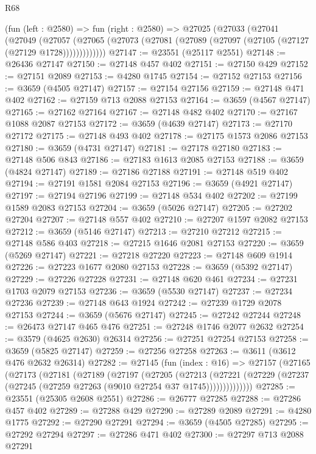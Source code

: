 \begin{lexlean}{R68}
\begin{coremodule}
    (fun (left : @2580) =>
    fun (right : @2580) =>
    @27025
      (@27033
        (@27041
          (@27049
            (@27057
              (@27065 (@27073 (@27081 (@27089 (@27097 (@27105 (@27127 (@27129 @1728)))))))))))))
@27147 := @23551 (@25117 @2551)
@27148 := @26436 @27147
@27150 := @27148 @457 @402
@27151 := @27150 @429
@27152 := @27151 @2089
@27153 := @4280 @1745
@27154 := @27152 @27153
@27156 := @3659 (@4505 @27147)
@27157 := @27154 @27156
@27159 := @27148 @471 @402
@27162 := @27159 @713 @2088 @27153
@27164 := @3659 (@4567 @27147)
@27165 := @27162 @27164
@27167 := @27148 @482 @402
@27170 := @27167 @1088 @2087 @27153
@27172 := @3659 (@4639 @27147)
@27173 := @27170 @27172
@27175 := @27148 @493 @402
@27178 := @27175 @1573 @2086 @27153
@27180 := @3659 (@4731 @27147)
@27181 := @27178 @27180
@27183 := @27148 @506 @843
@27186 := @27183 @1613 @2085 @27153
@27188 := @3659 (@4824 @27147)
@27189 := @27186 @27188
@27191 := @27148 @519 @402
@27194 := @27191 @1581 @2084 @27153
@27196 := @3659 (@4921 @27147)
@27197 := @27194 @27196
@27199 := @27148 @534 @402
@27202 := @27199 @1589 @2083 @27153
@27204 := @3659 (@5026 @27147)
@27205 := @27202 @27204
@27207 := @27148 @557 @402
@27210 := @27207 @1597 @2082 @27153
@27212 := @3659 (@5146 @27147)
@27213 := @27210 @27212
@27215 := @27148 @586 @403
@27218 := @27215 @1646 @2081 @27153
@27220 := @3659 (@5269 @27147)
@27221 := @27218 @27220
@27223 := @27148 @609 @1914
@27226 := @27223 @1677 @2080 @27153
@27228 := @3659 (@5392 @27147)
@27229 := @27226 @27228
@27231 := @27148 @620 @461
@27234 := @27231 @1703 @2079 @27153
@27236 := @3659 (@5530 @27147)
@27237 := @27234 @27236
@27239 := @27148 @643 @1924
@27242 := @27239 @1729 @2078 @27153
@27244 := @3659 (@5676 @27147)
@27245 := @27242 @27244
@27248 := @26473 @27147 @465 @476
@27251 := @27248 @1746 @2077 @2632
@27254 := @3579 (@4625 @2630) @26314
@27256 := @27251 @27254 @27153
@27258 := @3659 (@5825 @27147)
@27259 := @27256 @27258
@27263 := @3611 (@3612 @476 @2632 @26314)
@27282 := @27145
    (fun (index : @16) =>
    @27157
      (@27165
        (@27173
          (@27181
            (@27189
              (@27197
                (@27205
                  (@27213
                    (@27221
                      (@27229 (@27237 (@27245 (@27259 @27263 (@9010 @27254 @37 @1745))))))))))))))
@27285 := @23551 (@25305 @2608 @2551)
@27286 := @26777 @27285
@27288 := @27286 @457 @402
@27289 := @27288 @429
@27290 := @27289 @2089
@27291 := @4280 @1775
@27292 := @27290 @27291
@27294 := @3659 (@4505 @27285)
@27295 := @27292 @27294
@27297 := @27286 @471 @402
@27300 := @27297 @713 @2088 @27291

\end{coremodule}
\end{lexlean}
